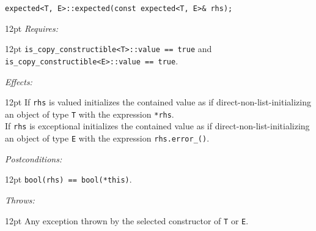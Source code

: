 \documentclass[a4paper,10pt]{article}
\newcommand{\cpp}[1]{\lstinline{#1}}
\newcommand{\wordingItem}[1]{\noindent\textit{#1:}}
\newenvironment{wordingTextItem}[1]{\wordingItem{#1}\vspace{7pt}\noindent\begin{adjustwidth}{12pt}{}}{\vspace{7pt}\end{adjustwidth}}
\newenvironment{wordingPara}{\begin{adjustwidth}{12pt}{}}{\end{adjustwidth}}
\begin{document}
\begin{lstlisting}[xleftmargin=0pt]
expected<T, E>::expected(const expected<T, E>& rhs);
\end{lstlisting}
\begin{wordingPara}
\begin{wordingTextItem}{Requires} \cpp{is_copy_constructible<T>::value == true} and\\
\cpp{is_copy_constructible<E>::value == true}.
\end{wordingTextItem}
\begin{wordingTextItem}{Effects}
If \cpp{rhs} is valued initializes the contained value as if direct-non-list-initializing an object of type \cpp{T} with the expression \cpp{*rhs}.\\

\noindent
If \cpp{rhs} is exceptional initializes the contained value as if direct-non-list-initializing an object of type \cpp{E} with the expression \cpp{rhs.error_()}.
\end{wordingTextItem}
\begin{wordingTextItem}{Postconditions}
\cpp{bool(rhs) == bool(*this)}.
\end{wordingTextItem}
\begin{wordingTextItem}{Throws}
Any exception thrown by the selected constructor of \cpp{T} or \cpp{E}.
\end{wordingTextItem}
\end{wordingPara}
\end{document}
